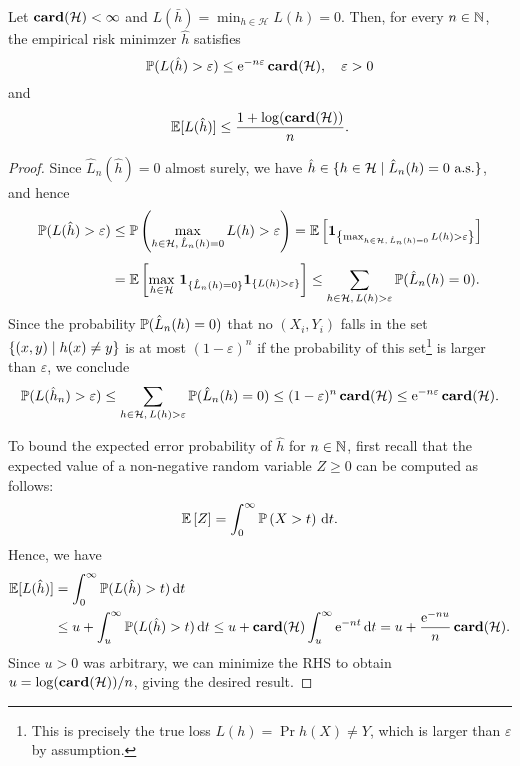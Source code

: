 \begin{theorem}
Let $\card{\mathcal{H}} < \infty$ and $L(\bar h) = \min_{h \in \mathcal{H}} L(h) = 0$. Then, for every $n \in \N$, the empirical risk minimzer $\hat h$ satisfies
\[
    \P(L(\hat h) > \varepsilon) \leq \e^{-n \varepsilon} \, \card{\mathcal{H}}, \quad \varepsilon > 0
\]
and
\[
    \ex{L(\hat h)} \leq \frac{1 + \log(\card{\mathcal{H}})}{n}.
\]
\end{theorem}

\begin{proof}
Since $\hat L_n(\hat h) = 0$ almost surely, we have $\hat h \in \{h \in \mathcal{H} \with \hat L_n(h) = 0 \text{ a.s.}\}$, and hence
\begin{align*}
    \P(L(\hat h) > \varepsilon) &\leq \Pr{\max_{h \in \mathcal{H}, \, \hat L_n(h) = 0} L(h) > \varepsilon} = \Ex{\indSet{\max_{h \in \mathcal{H}, \, \hat L_n(h) = 0} L(h) > \varepsilon}} \\[4pt]
        &=\Ex{\max_{h\in\mathcal{H}} \, \mathbf{1}_{\{\hat L_n(h) = 0\}} \indSet{L(h) > \varepsilon}} \leq \sum_{h\in\mathcal{H}, \, L(h) > \varepsilon} \P(\hat L_n(h) = 0).
\end{align*}
Since the probability $\P(\hat L_n(h) = 0)$ that no $(X_i, Y_i)$ falls in the set $\set{(x, y) \with h(x) \neq y}$ is at most $(1 - \varepsilon)^n$ if the probability of this set\footnote{This is precisely the true loss $L(h) = \Pr{h(X) \neq Y}$, which is larger than $\varepsilon$ by assumption.} is larger than $\varepsilon$, we conclude
\[
    \P(L(\hat h_n) > \varepsilon) \leq \sum_{h\in\mathcal{H}, \, L(h) > \varepsilon} \P(\hat L_n(h) = 0) \leq (1 - \varepsilon)^n \, \card{\mathcal{H}} \leq \e^{-n \varepsilon} \, \card{\mathcal{H}}.
\]

To bound the expected error probability of $\hat h$ for $n \in \N$, first recall that the expected value of a non-negative random variable $Z \geq 0$ can be computed as follows:
\[
    \Ex{Z} = \int_0^\infty \Pr{X > t} \dt.
\]
Hence, we have
\begin{align*}
    \ex{L(\hat h)} &= \int_0^\infty \P(L(\hat h) > t) \dt \\
        &\leq u + \int_u^\infty \P(L(\hat h) > t) \dt \leq u + \card{\mathcal{H}} \int_u^\infty \e^{-nt} \dt = u + \frac{\e^{-nu}}{n} \, \card{\mathcal{H}}.
\end{align*}
Since $u > 0$ was arbitrary, we can minimize the RHS to obtain $u = \log(\card{\mathcal{H}}) / n$, giving the desired result.
\end{proof}
